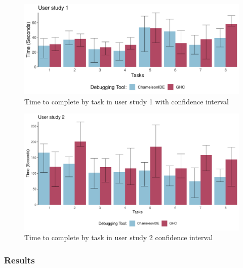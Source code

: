 
\begin{figure}[h]
    \centering
    \includegraphics[width=\linewidth]{images/r1-data.pdf}
    \caption{Time to complete by task in user study 1 with confidence interval}
    \label{fig:r1-analysis}
\end{figure}


\begin{figure}[h]
    \centering
    \includegraphics[width=\linewidth]{images/r2-data.pdf}
    \caption{Time to complete by task in user study 2 confidence interval}
    \label{fig:r2-analysis}
\end{figure}

\subsubsection*{\textbf {Results}}

